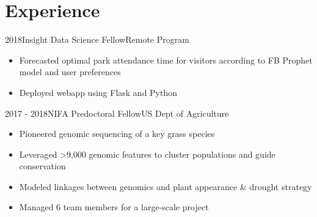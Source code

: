 \documentclass[letterpaper]{twentysecondcv} %
\begin{document}
\section{Experience}
\begin{twenty}

        	\twentyitem
    	{2018}{}{Insight Data Science Fellow}{Remote Program}
        	{}
        { \vspace{-2mm}
        {\begin{itemize}
        \item Forecasted optimal park attendance time for visitors according to FB Prophet model and user preferences  \vspace{0.4mm} 
        \item Deployed webapp using Flask and Python
    \end{itemize}}  \vspace{6mm} } 
    
       \twentyitem
    	{2017 - }{2018}{NIFA Predoctoral Fellow}{US Dept of Agriculture}
        	{}
        { \vspace{-2mm}
        {\begin{itemize}
        \item Pioneered genomic sequencing of a key grass species  \vspace{0.4mm} 
        \item Leveraged >9,000 genomic features to cluster populations and guide conservation \vspace{0.4mm} 
        \item Modeled linkages between genomics and plant appearance \& drought strategy \vspace{0.4mm} 
        \item Managed 6 team members for a large-scale project \vspace{0.4mm} 
    \end{itemize}}  \vspace{6mm}  } 


\end{twenty}
\end{document}
